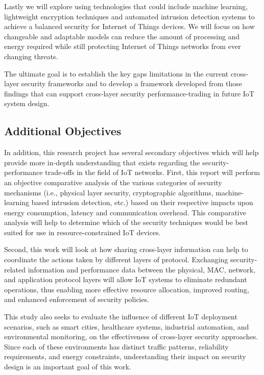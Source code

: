 \documentclass[a4paper,fleqn]{cas-dc}
\numberwithin{equation}{section}
\begin{document}
Lastly we will explore using technologies that could include machine learning, lightweight encryption techniques and automated intrusion detection systems to achieve a balanced security for Internet of Things devices. We will focus on how changeable and adaptable models can reduce the amount of processing and energy required while still protecting Internet of Things networks from ever changing threats.

The ultimate goal is to establish the key gaps limitations in the current cross‐layer security frameworks and to develop a framework developed from those findings that can support cross‐layer security performance‐trading in future IoT system design.



\subsection{Additional Objectives}

In addition, this research project has several secondary objectives which will help provide more in‐depth understanding that exists regarding the security-performance trade‐offs in the field of IoT networks. First, this report will perform an objective comparative analysis of the various categories of security mechanisms (i.e., physical layer security, cryptographic algorithms, machine-learning based intrusion detection, etc.) based on their respective impacts upon energy consumption, latency and communication overhead. This comparative analysis will help to determine which of the security techniques would be best suited for use in resource-constrained IoT devices.



Second, this work will look at how sharing cross-layer information can help to coordinate the actions taken by different layers of protocol. Exchanging security-related information and performance data between the physical, MAC, network, and application protocol layers will allow IoT systems to eliminate redundant operations, thus enabling more effective resource allocation, improved routing, and enhanced enforcement of security policies.

This study also seeks to evaluate the influence of different IoT deployment scenarios, such as smart cities, healthcare systems, industrial automation, and environmental monitoring, on the effectiveness of cross-layer security approaches. Since each of these environments has distinct traffic patterns, reliability requirements, and energy constraints, understanding their impact on security design is an important goal of this work.
\end{document}

